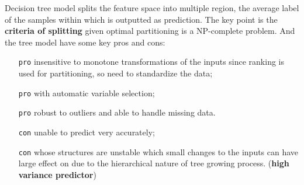 Decision tree model splits the feature space into multiple region, 
the average label of the samples within which is outputted as prediction. 
The key point is the \textbf{criteria of splitting} given optimal partitioning is a NP-complete problem.
And the tree model have some key pros and cons:
\begin{itemize}
    \item [\texttt{pro}] insensitive to monotone transformations of the inputs since ranking is used for partitioning,
    so need to standardize the data;
    \item [\texttt{pro}] with automatic variable selection;
    \item [\texttt{pro}] robust to outliers and able to handle missing data.
    \item [\texttt{con}] unable to predict very accurately;
    \item [\texttt{con}] whose structures are unstable which small changes to the inputs can have large effect on 
    due to the hierarchical nature of tree growing process. (\textbf{high variance predictor})
\end{itemize}



